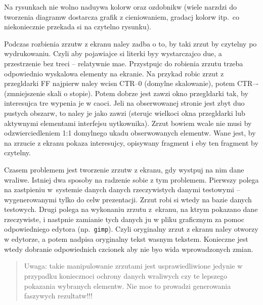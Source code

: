 Na rysunkach nie wolno naduywa kolorw oraz ozdobnikw (wiele narzdzi do tworzenia diagramw dostarcza grafik z cieniowaniem, gradacj kolorw itp.\  co niekoniecznie przekada si na czytelno rysunku).

Podczas rozbienia zrzutw z ekranu naley zadba o to, by taki zrzut by czytelny po wydrukowaniu. Czyli aby pojawiajce si literki byy wystarczajco due, a przestrzenie bez treci -- relatywnie mae.
Przystpujc do robienia zrzutu trzeba odpowiednio wyskalowa elementy na ekranie. Na przykad robic zrzut z przegldarki FF najpierw naley wcisn CTR--0 (domylne skalowanie), potem CTR--{}- (zmniejszenie skali o stopie). Potem dobrze jest zawzi okno przegldarki tak, by interesujca tre wypenia je w caoci. Jeli na obserwowanej stronie jest zbyt duo pustych obszarw, to naley je jako zawzi (sterujc wielkoci okna przegldarki lub aktywnymi elementami interfejsu uytkownika). Zrzut bowiem wcale nie musi by odzwierciedleniem 1:1 domylnego ukadu obserwowanych elementw. Wane jest, by na zrzucie z ekranu pokaza interesujcy, opisywany fragment i eby ten fragment by czytelny.
	
Czasem problemem jest tworzenie zrzutw z ekranu, gdy wystpuj na nim dane wraliwe. Istniej dwa sposoby na radzenie sobie z tym problemem.
Pierwszy polega na zastpieniu w~systemie danych danych rzeczywistych danymi testowymi -- wygenerowanymi tylko do celw prezentacji.
Zrzut robi si wtedy na bazie danych testowych.
Drugi polega na wykonaniu zrzutu z~ekranu, na ktrym pokazano dane rzeczywiste, i nastpnie zamianie tych danych ju w pliku graficznym
za pomoc odpowiedniego edytora (np.~\texttt{gimp}). Czyli oryginalny zrzut z ekranu naley otworzy w edytorze, a potem
nadpisa oryginalny tekst wasnym tekstem. Konieczne jest wtedy dobranie odpowiednich czcionek aby nie byo wida
wprowadzonych zmian. 
\begin{quotation}
Uwaga: takie manipulowanie zrzutami jest usprawiedliwione jedynie w przypadku koniecznoci ochrony danych wraliwych czy te lepszego pokazania wybranych elementw. Nie moe to prowadzi generowania faszywych rezultatw!!!
\end{quotation}

